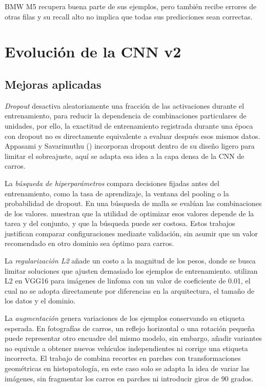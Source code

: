 \documentclass[conference]{IEEEtran}
\begin{document}
BMW M5 recupera buena parte de sus ejemplos, pero también recibe errores de otras filas y su recall alto no implica que todas sus predicciones sean correctas.


\FloatBarrier
\section{Evolución de la CNN v2}

\subsection{Mejoras aplicadas}

\textit{Dropout} desactiva aleatoriamente una fracción de las activaciones durante el entrenamiento, para reducir la dependencia de combinaciones particulares de unidades, por ello, la exactitud de entrenamiento registrada durante una época con dropout no es directamente equivalente a evaluar después esos mismos datos. Appasami y Savarimuthu (\citeyear{appasami2025}) incorporan dropout dentro de su diseño ligero para limitar el sobreajuste, aquí se adapta esa idea a la capa densa de la CNN de carros.

La \textit{búsqueda de hiperparámetros} compara decisiones fijadas antes del entrenamiento, como la tasa de aprendizaje, la ventana del pooling o la probabilidad de dropout. En una búsqueda de malla se evalúan las combinaciones de los valores. \citet{wojciuk2024} muestran que la utilidad de optimizar esos valores depende de la tarea y del conjunto, y que la búsqueda puede ser costosa. Estos trabajos justifican comparar configuraciones mediante validación, sin asumir que un valor recomendado en otro dominio sea óptimo para carros.

La \textit{regularización L2} añade un costo a la magnitud de los pesos, donde se busca limitar soluciones que ajusten demasiado los ejemplos de entrenamiento. \citet{segota2025} utilizan L2 en VGG16 para imágenes de linfoma con un valor de coeficiente de 0.01, el cual no se adopta directamente por diferencias en la arquitectura, el tamaño de los datos y el dominio. 

La \textit{augmentación} genera variaciones de los ejemplos conservando su etiqueta esperada. En fotografías de carros, un reflejo horizontal o una rotación pequeña puede representar otro encuadre del mismo modelo, sin embargo, añadir variantes no equivale a obtener nuevos vehículos independientes ni corrige una etiqueta incorrecta. El trabajo de \citet{segota2025} combina recortes en parches con transformaciones geométricas en histopatología, en este caso solo se adapta la idea de variar las imágenes, sin fragmentar los carros en parches ni introducir giros de 90 grados. 
\end{document}
